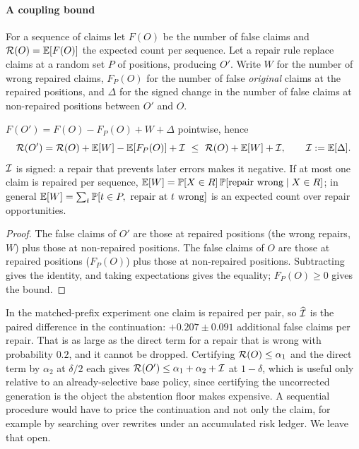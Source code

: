 \paragraph{A coupling bound}
For a sequence of claims let $F(O)$ be the number of false claims and $\mathcal{R}(O)=\mathbb{E}[F(O)]$ the expected count per
sequence. Let a repair rule replace claims at a random set $P$ of positions, producing $O'$.
Write $W$ for the number of wrong repaired claims, $F_P(O)$ for the number of false \emph{original} claims at the
repaired positions, and $\Delta$ for the signed change in the number of false claims at non-repaired positions
between $O'$ and $O$.

\begin{theorem}
\label{thm:coupling}
$F(O')=F(O)-F_P(O)+W+\Delta$ pointwise, hence
\[
\Risk(O')=\Risk(O)+\E[W]-\E[F_P(O)]+\Iota\ \le\ \Risk(O)+\E[W]+\Iota,\qquad \Iota:=\E[\Delta].
\]
$\mathcal{I}$ is signed: a repair that prevents later errors makes it negative. If at most one claim is repaired per
sequence, $\mathbb{E}[W]=\mathbb{P}[X\in R]\,\mathbb{P}[\text{repair wrong}\mid X\in R]$; in general $\mathbb{E}[W]=\sum_t\mathbb{P}[t\in P,\ \text{repair at }t\text{ wrong}]$ is an expected
count over repair opportunities.
\end{theorem}
\begin{proof}
The false claims of $O'$ are those at repaired positions (the wrong repairs, $W$) plus those at non-repaired positions. The false claims of $O$ are
those at repaired positions ($F_P(O)$) plus those at non-repaired positions. Subtracting gives the identity, and taking
expectations gives the equality; $F_P(O)\ge0$ gives the bound.
\end{proof}

In the matched-prefix experiment one claim is repaired per pair, so $\widehat{\mathcal{I}}$ is the paired difference in
the continuation: $+0.207\pm0.091$ additional false claims per repair. That is as large as the direct term for a
repair that is wrong with probability $0.2$, and it cannot be dropped. Certifying $\mathcal{R}(O)\le\alpha_1$ and the direct term by
$\alpha_2$ at $\delta/2$ each gives $\mathcal{R}(O')\le\alpha_1+\alpha_2+\mathcal{I}$ at $1-\delta$, which is useful only
relative to an already-selective base policy, since certifying the uncorrected generation is the object the
abstention floor makes expensive. A sequential procedure would have to price the continuation and not only the claim,
for example by searching over rewrites under an accumulated risk ledger. We leave that open.
